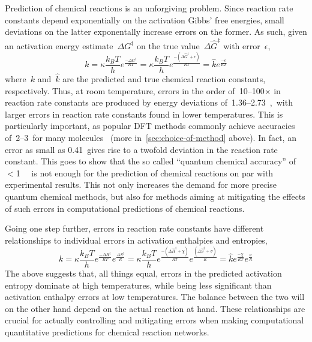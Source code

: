 Prediction of chemical reactions is an unforgiving problem.
Since reaction rate constants depend exponentially on the activation Gibbs' free energies,
small deviations on the latter exponentally increase errors on the former.
As such,
given an activation energy estimate~$\Delta G^\ddagger$
on the true value~$\Delta \widehat{G}^\ddagger$
with error~$\epsilon$,
%
\begin{equation}
	k = \kappa \frac{k_B T}{h} e^\frac{- \Delta G^\ddagger}{R T}
	= \kappa \frac{k_B T}{h} e^\frac{- \left(\Delta \widehat{G}^\ddagger + \epsilon\right)}{R T}
	= \widehat{k} e^\frac{- \epsilon}{R T}
\end{equation}
%
where~$k$ and~$\widehat{k}$ are the predicted and true chemical reaction constants,
respectively.
Thus,
at room temperature,
errors in the order of~10--100$\times$
in reaction rate constants
are produced by
energy deviations of~1.36--2.73~\kcalmol,~with larger errors in reaction rate constants found in lower temperatures.
This is particularly important,
as popular DFT methods commonly achieve accuracies of~2--3~\kcalmol for many molecules~\cite{Becke_2014,Bogojeski_2020} (more in~\cref{sec:choice-of-method} above).
In fact,
an error as small as 0.41~\kcalmol gives rise to a twofold deviation in the reaction rate constant.
This goes to show that the so called ``quantum chemical accuracy'' of
$<$1~\kcalmol~\cite{Bogojeski_2020}
is not enough for the prediction of chemical reactions on par with experimental results.
This not only increases the demand
for more precise quantum chemical methods,
but also for methods aiming at mitigating the effects of such errors
in computational predictions of chemical reactions.

Going one step further,
errors in reaction rate constants
have different relationships to individual errors in activation enthalpies and entropies,
%
\begin{equation}
	k = \kappa \frac{k_B T}{h} e^\frac{- \Delta H^\ddagger}{R T}
	e^\frac{  \Delta S^\ddagger}{R}
	= \kappa \frac{k_B T}{h} e^\frac{- \left(\Delta \widehat{H}^\ddagger + \chi\right)}{R T}
	e^\frac{        \left(\Delta \widehat{S}^\ddagger + \sigma\right)}{R}
	= \widehat{k}
	e^\frac{- \chi}{R T}
	e^\frac{  \sigma}{R}
\end{equation}
%
The above suggests that,
all things equal,
errors in the predicted activation entropy dominate at high temperatures,
while being less significant
than activation enthalpy errors at low temperatures.
The balance between the two will on the other hand depend on the actual reaction at hand.
These relationships are crucial for actually controlling and mitigating errors
when making computational quantitative predictions
for chemical reaction networks.

